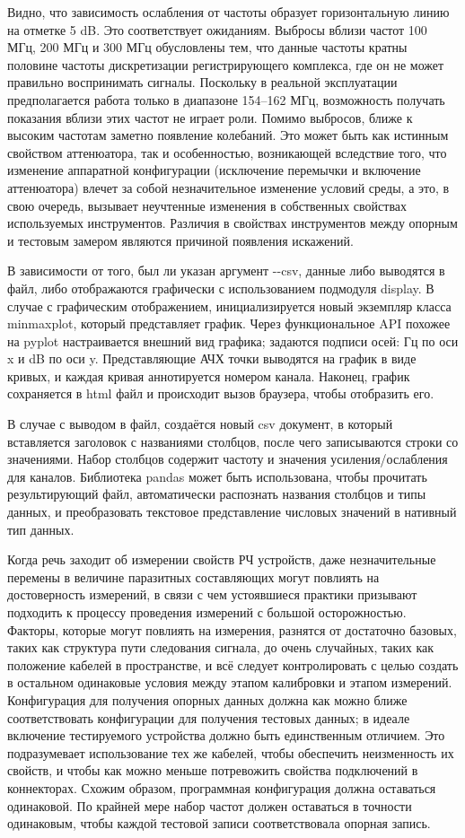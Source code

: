 \documentclass{report}
\begin{document}
Видно, что зависимость ослабления от частоты образует горизонтальную линию на отметке 5 dB. Это соответствует ожиданиям. Выбросы вблизи частот 100 МГц, 200 МГц и 300 МГц обусловлены тем, что данные частоты кратны половине частоты дискретизации регистрирующего комплекса, где он не может правильно воспринимать сигналы. Поскольку в реальной эксплуатации предполагается работа только в диапазоне 154--162 МГц, возможность получать показания вблизи этих частот не играет роли. Помимо выбросов, ближе к высоким частотам заметно появление колебаний. Это может быть как истинным свойством аттенюатора, так и особенностью, возникающей вследствие того, что изменение аппаратной конфигурации (исключение перемычки и включение аттенюатора) влечет за собой незначительное изменение условий среды, а это, в свою очередь, вызывает неучтенные изменения в собственных свойствах используемых инструментов. Различия в свойствах инструментов между опорным и тестовым замером являются причиной появления искажений.

В зависимости от того, был ли указан аргумент -{}-csv, данные либо выводятся в файл, либо отображаются графически с использованием подмодуля display. В случае с графическим отображением, инициализируется новый экземпляр класса minmaxplot, который представляет график. Через функциональное API похожее на pyplot настраивается внешний вид графика; задаются подписи осей: Гц по оси x и dB по оси y. Представляющие АЧХ точки выводятся на график в виде кривых, и каждая кривая аннотируется номером канала. Наконец, график сохраняется в html файл и происходит вызов браузера, чтобы отобразить его.

В случае с выводом в файл, создаётся новый csv документ, в который вставляется заголовок с названиями столбцов, после чего записываются строки со значениями. Набор столбцов содержит частоту и значения усиления/ослабления для каналов. Библиотека pandas может быть использована, чтобы прочитать результирующий файл, автоматически распознать названия столбцов и типы данных, и преобразовать текстовое представление числовых значений в нативный тип данных.

Когда речь заходит об измерении свойств РЧ устройств, даже незначительные перемены в величине паразитных составляющих могут повлиять на достоверность измерений, в связи с чем устоявшиеся практики призывают подходить к процессу проведения измерений с большой осторожностью. Факторы, которые могут повлиять на измерения, разнятся от достаточно базовых, таких как структура пути следования сигнала, до очень случайных, таких как положение кабелей в пространстве, и всё следует контролировать с целью создать в остальном одинаковые условия между этапом калибровки и этапом измерений. Конфигурация для получения опорных данных должна как можно ближе соответствовать конфигурации для получения тестовых данных; в идеале включение тестируемого устройства должно быть единственным отличием. Это подразумевает использование тех же кабелей, чтобы обеспечить неизменность их свойств, и чтобы как можно меньше потревожить свойства подключений в коннекторах. Схожим образом, программная конфигурация должна оставаться одинаковой. По крайней мере набор частот должен оставаться в точности одинаковым, чтобы каждой тестовой записи соответствовала опорная запись.
\end{document}
